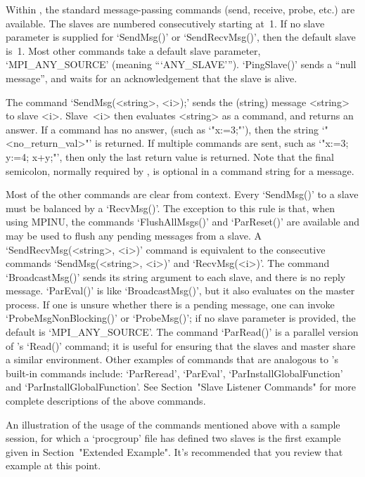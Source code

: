 Within {\ParGAP}, the standard message-passing commands  (send,  receive,
probe,  etc.)  are  available.  The  slaves  are  numbered  consecutively
starting at~1. If no slave  parameter  is  supplied  for  `SendMsg()'  or
`SendRecvMsg()', then the default slave is~1. Most other commands take  a
default  slave  parameter,  `MPI_ANY_SOURCE'  (meaning  ```ANY_SLAVE''').
`PingSlave()' sends a ``null message'', and waits for an  acknowledgement
that the slave is alive.

The command `SendMsg(<string>, <i>);' sends the (string) message <string>
to slave <i>. Slave~<i> then evaluates <string> as a {\GAP} command,  and
returns an answer. If a command has no answer, (such as `"x:=3;"'),  then
the string `"<no_return_val>"' is  returned.  If  multiple  commands  are
sent, such as `"x:=3; y:=4; x+y;"', then only the last  return  value  is
returned. Note that the final semicolon, normally required by {\GAP},  is
optional in a command string for a message.

Most of the other commands are clear from context. Every `SendMsg()' to a
slave must be balanced  by  a  `RecvMsg()'. The exception to this rule
is that, when using MPINU, the  commands `FlushAllMsgs()' and `ParReset()' 
are available and may be used to flush any pending  messages
from a slave. A `SendRecvMsg(<string>, <i>)' command is equivalent to the
consecutive commands `SendMsg(<string>,  <i>)'  and  `RecvMsg(<i>)'.  The
command `BroadcastMsg()' sends its string argument  to  each  slave,  and
there is no reply message. `ParEval()' is like `BroadcastMsg()',  but  it
also evaluates on the master process. If one is unsure whether there is a
pending message, one can invoke `ProbeMsgNonBlocking()' or  `ProbeMsg()';
if no slave parameter is provided, the default is  `MPI_ANY_SOURCE'.  The
command `ParRead()' is a parallel version of {\GAP}'s  `Read()'  command;
it is useful for ensuring that the slaves  and  master  share  a  similar
environment. Other examples of commands that are  analogous  to  {\GAP}'s
built-in      commands       include:       `ParReread',       `ParEval',
`ParInstallGlobalFunction'    and     `ParInstallGlobalFunction'.     See
Section~"Slave Listener Commands" for more complete descriptions  of  the
above commands.

An illustration of the usage of  the  commands  mentioned  above  with  a
sample {\ParGAP} session, for which a `procgroup' file  has  defined  two
slaves is the first example given  in  Section~"Extended  Example".  It's
recommended that you review that example at this point.

